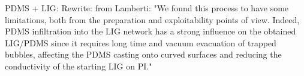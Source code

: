 PDMS + LIG:
Rewrite:
from Lamberti: "We found this process to have some limitations,
both from the preparation and exploitability points of view.
Indeed, PDMS infiltration into the LIG network has a strong
influence on the obtained LIG/PDMS since it requires long
time and vacuum evacuation of trapped bubbles, affecting the
PDMS casting onto curved surfaces and reducing the
conductivity of the starting LIG on PI."